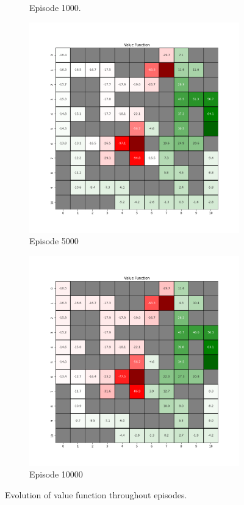 \documentclass{assignment}
\begin{document}
\begin{figure}[H]
\begin{subfigure}{0.3\textwidth}
    \caption{Episode 1000.}
    \end{subfigure}\hfill
    \begin{subfigure}{0.3\textwidth}
        \includegraphics[width=\textwidth]{figures/value_td/alpha_sweep/value_function_alpha_0.1_gamma_0.95_epsilon_0.2_iteration_5000.png}
    \caption{Episode 5000}
    \end{subfigure}\hfill
    \begin{subfigure}{0.3\textwidth}
        \includegraphics[width=\textwidth]{figures/value_td/alpha_sweep/value_function_alpha_0.1_gamma_0.95_epsilon_0.2_iteration_10000.png}
    \caption{Episode 10000}
    \end{subfigure}
    \caption{Evolution of value function throughout episodes.}
    \label{fig:alpha_0.1_td_learning_value}
\end{figure}
\end{document}
